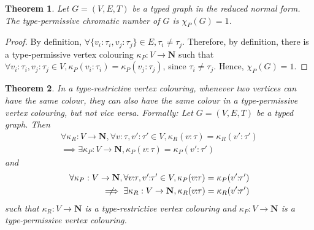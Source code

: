 \documentclass[preprint,12pt]{elsarticle}
\theoremstyle{plain}
\newtheorem{theorem}{Theorem}[section]
\newcommand\tyv[2]{#1\!\!:\!\!#2}
\begin{document}
\begin{theorem}
Let $G = (V,E,T)$ be a typed graph in the reduced normal form.
The type-permissive chromatic number of $G$ is $\chi_P(G)=1$.
\end{theorem}
\begin{proof}
By definition, $\forall \{\tyv{v_i}{\tau_i},\tyv{v_j}{\tau_j}\}\in E, \tau_i\neq\tau_j$.
Therefore, by definition,
there is a type-permissive vertex colouring
$\kappa_P:V\rightarrow \mathbf{N}$
such that
$\forall \tyv{v_i}{\tau_i},\tyv{v_j}{\tau_j}\in V, \kappa_P(\tyv{v_i}{\tau_i})=\kappa_P(\tyv{v_j}{\tau_j})$,
since $\tau_i\neq\tau_j$.
Hence, $\chi_P(G)=1$.
\end{proof}

\begin{theorem} \label{theorem:R4moreRestrictive}
In a type-restrictive vertex colouring,
whenever two vertices can have the same colour,
they can also have the same colour in a type-permissive vertex colouring,
but not vice versa. Formally: Let $G = (V,E,T)$ be a typed graph. Then
\begin{equation*}
\begin{split}
\forall \kappa_R:V\rightarrow \mathbf{N}, \forall \tyv{v}{\tau},\tyv{v'}{\tau'}\in V,
\kappa_R(\tyv{v}{\tau})=\kappa_R(\tyv{v'}{\tau'}) \\
\implies \exists \kappa_P:V\rightarrow \mathbf{N}, \kappa_P(\tyv{v}{\tau})=\kappa_P(\tyv{v'}{\tau'})
\end{split}
\end{equation*}
and
\begin{equation*}
\begin{split}
\forall \kappa_P:V\rightarrow \mathbf{N}, \forall \tyv{v}{\tau},\tyv{v'}{\tau'}\in V,
\kappa_P(\tyv{v}{\tau})=\kappa_P(\tyv{v'}{\tau'}) \\
\centernot\implies \exists \kappa_R:V\rightarrow \mathbf{N}, \kappa_R(\tyv{v}{\tau})=\kappa_R(\tyv{v'}{\tau'})
\end{split}
\end{equation*}
such that $\kappa_R:V\rightarrow \mathbf{N}$ is a type-restrictive vertex colouring
and $\kappa_P:V\rightarrow \mathbf{N}$ is a type-permissive vertex colouring.
\end{theorem}
\end{document}
